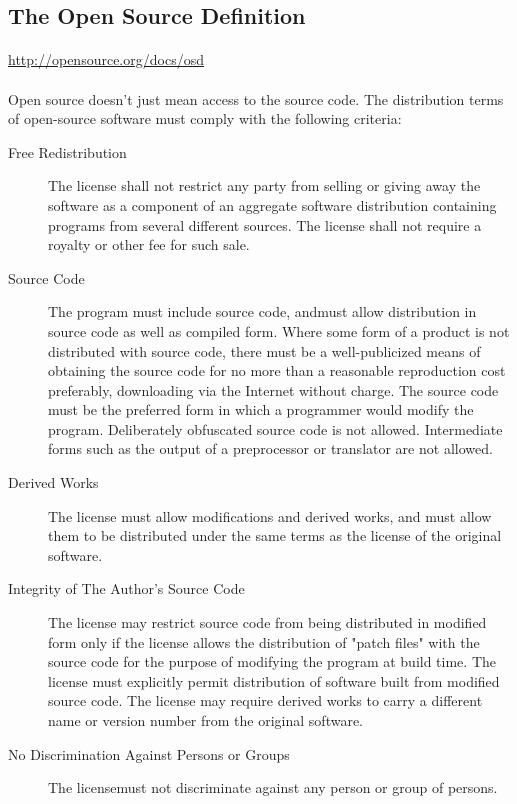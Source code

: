 \begin{appendices}
\section{The Open Source Definition}
\paragraph{}\url{http://opensource.org/docs/osd}
\paragraph{}Open source doesn't just mean access to the source code. The distribution terms of open-source software must comply with the following criteria:
\begin{description}
\item[Free Redistribution]{The license shall not restrict any party from selling or giving away the software as a component of an aggregate software distribution containing programs from several different sources. The license shall not require a royalty or other fee for such sale.}
\item[Source Code]{The program must include source code, and\linebreak must allow distribution in source code as well as compiled form. Where some form of a product is not distributed with source code, there must be a well-publicized means of obtaining the source code for no more than a reasonable reproduction cost preferably, downloading via the Internet without charge. The source code must be the preferred form in which a programmer would modify the program. Deliberately obfuscated source code is not allowed. Intermediate forms such as the output of a preprocessor or translator are not allowed.}
\item[Derived Works]{The license must allow modifications and derived works, and must allow them to be distributed under the same terms as the license of the original software.}
\item[Integrity of The Author's Source Code]{The license may restrict source code from being distributed in modified form only if the license allows the distribution of "patch files" with the source code for the purpose of modifying the program at build time. The license must explicitly permit distribution of software built from modified source code. The license may require derived works to carry a different name or version number from the original software.}
\item[No Discrimination Against Persons or Groups]{The license\linebreak must not discriminate against any person or group of persons.}

\end{description}
\end{appendices}
